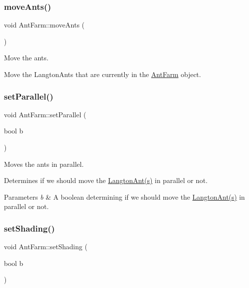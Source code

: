 \subsubsection{\texorpdfstring{move\+Ants()}{moveAnts()}}
{\footnotesize\ttfamily void Ant\+Farm\+::move\+Ants (\begin{DoxyParamCaption}{ }\end{DoxyParamCaption})}



Move the ants. 

Move the Langton\+Ants that are currently in the \hyperlink{class_ant_farm}{Ant\+Farm} object. \mbox{\label{class_ant_farm_ad4d22511ce20db2dedc7d61d4ca42e66}} 
\subsubsection{\texorpdfstring{set\+Parallel()}{setParallel()}}
{\footnotesize\ttfamily void Ant\+Farm\+::set\+Parallel (\begin{DoxyParamCaption}\item[{bool}]{b }\end{DoxyParamCaption})}



Moves the ants in parallel. 

Determines if we should move the \hyperlink{class_langton_ant}{Langton\+Ant(s)} in parallel or not. 
\begin{DoxyParams}{Parameters}
{\em b} & A boolean determining if we should move the \hyperlink{class_langton_ant}{Langton\+Ant(s)} in parallel or not. \\
\hline
\end{DoxyParams}
\mbox{\label{class_ant_farm_a5b333a275f2e0ff8700932fdfa04df08}} 
\subsubsection{\texorpdfstring{set\+Shading()}{setShading()}}
{\footnotesize\ttfamily void Ant\+Farm\+::set\+Shading (\begin{DoxyParamCaption}\item[{bool}]{b }\end{DoxyParamCaption})}



